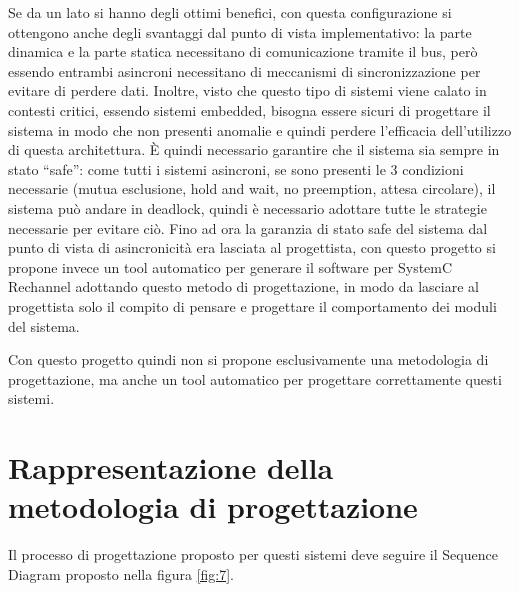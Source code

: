 \documentclass[a4paper,titlepage]{book}
\begin{document}
Se da un lato si hanno degli ottimi benefici, con questa configurazione si ottengono anche degli svantaggi dal punto di vista implementativo: la parte dinamica e la parte statica necessitano di comunicazione tramite il bus, però essendo entrambi asincroni necessitano di meccanismi di sincronizzazione per evitare di perdere dati. Inoltre, visto che questo tipo di sistemi viene calato in contesti critici, essendo sistemi embedded, bisogna essere sicuri di progettare il sistema in modo che non presenti anomalie e quindi perdere l'efficacia dell'utilizzo di questa architettura.
È quindi necessario garantire che il sistema sia sempre in stato ``safe'': come tutti i sistemi asincroni, se sono presenti le 3 condizioni necessarie (mutua esclusione, hold and wait, no preemption, attesa circolare), il sistema può andare in deadlock, quindi è necessario adottare tutte le strategie necessarie per evitare ciò.
Fino ad ora la garanzia di stato safe del sistema dal punto di vista di asincronicità era lasciata al progettista, con questo progetto si propone invece un tool automatico per generare il software per SystemC Rechannel adottando questo metodo di progettazione, in modo da lasciare al progettista solo il compito di pensare e progettare il comportamento dei moduli del sistema.

Con questo progetto quindi non si propone esclusivamente una metodologia di progettazione, ma anche un tool automatico per progettare correttamente questi sistemi.


\section{Rappresentazione della metodologia di progettazione}

Il processo di progettazione proposto per questi sistemi deve seguire il Sequence Diagram proposto nella figura \ref{fig:7}.
\end{document}
